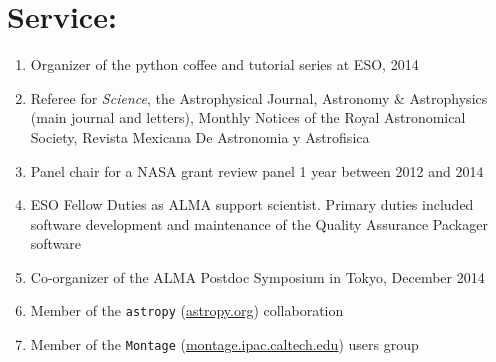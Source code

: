 \documentclass{article}
\begin{document}
\section*{Service:}
\begin{enumerate}
    \item Organizer of the python coffee and tutorial series at ESO, 2014
    \item Referee for \textit{Science}, the Astrophysical Journal, Astronomy \&
    Astrophysics (main journal and letters), Monthly Notices of the Royal
    Astronomical Society, Revista Mexicana De Astronomia y Astrofisica 
    \item Panel chair for a NASA grant review panel 1 year between 2012 and 2014
    \item ESO Fellow Duties as ALMA support scientist.  Primary duties included
        software development and maintenance of the Quality Assurance Packager
        software
    \item Co-organizer of the ALMA Postdoc Symposium in Tokyo, December 2014
    \item Member of the \texttt{astropy} (\url{astropy.org}) collaboration
    \item Member of the \texttt{Montage} (\url{montage.ipac.caltech.edu}) users group
\end{enumerate}





\newpage
\nocite{*}
\begin{footnotesize}

%

\end{footnotesize}
\end{document}
